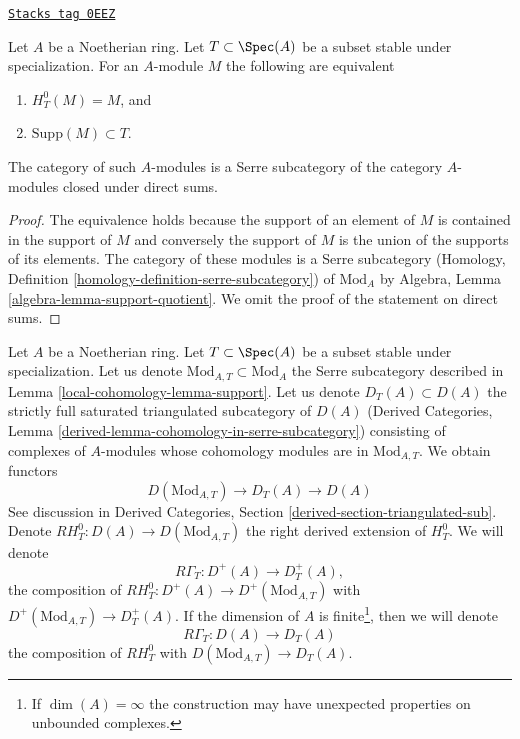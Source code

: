 \begin{lemma}[Support]
\label{local-cohomology-lemma-support}
\href{https://stacks.math.columbia.edu/tag/0EEZ}{\texttt{Stacks tag 0EEZ}}

Let $A$ be a Noetherian ring. Let $T \subset \Spec(A)$ be a subset stable
under specialization. For an $A$-module $M$ the following are equivalent
\begin{enumerate}
\item $H^0_T(M) = M$, and
\item $\text{Supp}(M) \subset T$.
\end{enumerate}
The category of such $A$-modules is a Serre subcategory
of the category $A$-modules closed under direct sums.
\end{lemma}

\begin{proof}
The equivalence holds because the support of an element of $M$
is contained in the support of $M$ and conversely the support of
$M$ is the union of the supports of its elements.
The category of these modules is a Serre subcategory
(Homology, Definition \ref{homology-definition-serre-subcategory})
of $\text{Mod}_A$ by
Algebra, Lemma \ref{algebra-lemma-support-quotient}.
We omit the proof of the statement on direct sums.
\end{proof}

Let $A$ be a Noetherian ring. Let $T \subset \Spec(A)$ be a subset stable
under specialization. Let us denote $\text{Mod}_{A, T} \subset \text{Mod}_A$
the Serre subcategory described in Lemma \ref{local-cohomology-lemma-support}.
Let us denote $D_T(A) \subset D(A)$ the
strictly full saturated triangulated subcategory of $D(A)$
(Derived Categories, Lemma \ref{derived-lemma-cohomology-in-serre-subcategory})
consisting of complexes of $A$-modules whose cohomology modules
are in $\text{Mod}_{A, T}$. We obtain functors
$$
D(\text{Mod}_{A, T}) \to D_T(A) \to D(A)
$$
See discussion in
Derived Categories, Section \ref{derived-section-triangulated-sub}.
Denote $RH^0_T : D(A) \to D(\text{Mod}_{A, T})$ the right
derived extension of $H^0_T$. We will denote
$$
R\Gamma_T : D^+(A) \to D^+_T(A),
$$
the composition of $RH^0_T : D^+(A) \to D^+(\text{Mod}_{A, T})$ with
$D^+(\text{Mod}_{A, T}) \to D^+_T(A)$. If the dimension of $A$ is
finite\footnote{If $\dim(A) = \infty$ the construction
may have unexpected properties on unbounded complexes.},
then we will denote
$$
R\Gamma_T : D(A) \to D_T(A)
$$
the composition of $RH^0_T$ with
$D(\text{Mod}_{A, T}) \to D_T(A)$.

